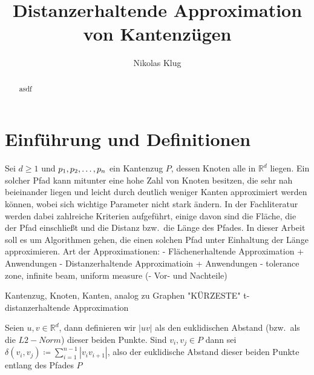 \documentclass[11pt]{article}
\title{Distanzerhaltende Approximation von Kantenzügen}
\author{Nikolas Klug}
\newcommand{\R}{\mathbb{R}}
\newcommand{\n}{\newline}
\begin{document}
    \maketitle

    \begin{abstract}
        asdf
    \end{abstract}

    \section{Einführung und Definitionen}
    \label{sec:intro}

    Sei $d\geq1$ und $p_1, p_2, \mathellipsis, p_n$ ein Kantenzug $P$, dessen Knoten alle in $\R^{d}$ liegen.
    Ein solcher Pfad kann mitunter eine hohe Zahl von Knoten besitzen, die sehr nah beieinander liegen und leicht durch deutlich weniger Kanten approximiert werden können, wobei sich wichtige Parameter nicht stark ändern. In der Fachliteratur werden dabei zahlreiche Kriterien aufgeführt, einige davon sind die Fläche, die der Pfad einschließt und die Distanz bzw.\ die Länge des Pfades. In dieser Arbeit soll es um Algorithmen gehen, die einen solchen Pfad unter Einhaltung der Länge approximieren.
    Art der Approximationen:
    - Flächenerhaltende Approximation + Anwendungen\n
    - Distanzerhaltende Approximatioin + Anwendungen\n
    - tolerance zone, infinite beam, uniform measure\textellipsis\n
    (- Vor- und Nachteile)
    
    Kantenzug, Knoten, Kanten, analog zu Graphen
    "KÜRZESTE" t-distanzerhaltende Approximation

    Seien $u, v \in \R^d$, dann definieren wir $|uv|$ als den euklidischen Abstand
    (bzw.\ als die $L2-Norm$) dieser beiden Punkte.
    Sind $v_i, v_j \in P$ dann sei $\delta(v_i, v_j) \coloneqq \sum\limits_{i=1}^{n-1}{|v_i
    v_{i+1}|}$, also der euklidische Abstand dieser beiden Punkte entlang des Pfades $P$
\end{document}
